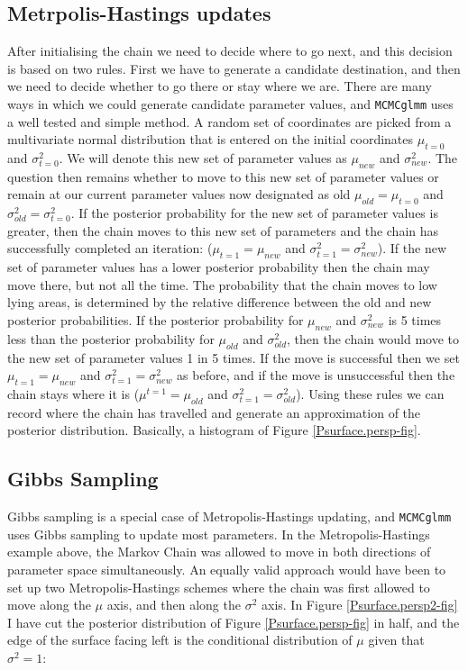 \documentclass{article}
\begin{document}
\subsection{Metrpolis-Hastings updates}

After initialising the chain we need to decide where to go next, and this decision is based on two rules.  First we have to generate a candidate destination, and then we need to decide whether to go there or stay where we are.  There are many ways in which we could generate candidate parameter values, and \texttt{MCMCglmm} uses a well tested and simple method. A random set of coordinates are picked from a multivariate normal distribution that is entered on the initial coordinates  $\mu_{t=0}$ and $\sigma^{2}_{t=0}$.  We will denote this new set of parameter values as  $\mu_{new}$ and $\sigma^{2}_{new}$. The question then remains whether to move to this new set of parameter values or remain at our current parameter values now designated as old $\mu_{old}=\mu_{t=0}$ and $\sigma^{2}_{old}=\sigma^{2}_{t=0}$.  If the posterior probability for the new set of parameter values is greater, then the chain moves to this new set of parameters and the chain has successfully completed an iteration: ($\mu_{t=1} = \mu_{new}$ and $\sigma^{2}_{t=1}=\sigma^{2}_{new}$).  If the new set of parameter values has a lower posterior probability then the chain may move there, but not all the time.  The probability that the chain moves to low lying areas, is determined by the relative difference between the old and new posterior probabilities.  If the posterior probability for $\mu_{new}$ and $\sigma^{2}_{new}$ is 5 times less than the posterior probability for $\mu_{old}$ and $\sigma^{2}_{old}$, then the chain would move to the new set of parameter values 1 in 5 times. If the move is successful then we set $\mu_{t=1} = \mu_{new}$ and $\sigma^{2}_{t=1}=\sigma^{2}_{new}$ as before, and if the move is unsuccessful then the chain stays where it is ($\mu^{t=1} = \mu_{old}$ and $\sigma^{2}_{t=1}=\sigma^{2}_{old}$).  Using these rules we can record where the chain has travelled and generate an approximation of the posterior distribution.  Basically, a histogram of Figure \ref{Psurface.persp-fig}.\\
 
\subsection{Gibbs Sampling}

Gibbs sampling is a special case of Metropolis-Hastings updating, and \texttt{MCMCglmm} uses Gibbs sampling to update most parameters.  In the Metropolis-Hastings example above, the Markov Chain was allowed to move in both directions of parameter space simultaneously.  An equally valid approach would have been to set up two Metropolis-Hastings schemes where the chain was first allowed to move along the $\mu$ axis, and then along the $\sigma^{2}$ axis. In Figure \ref{Psurface.persp2-fig} I have cut the posterior distribution of Figure \ref{Psurface.persp-fig} in half, and the edge of the surface facing left is the conditional distribution of $\mu$ given that $\sigma^{2}=1$:
\end{document}
